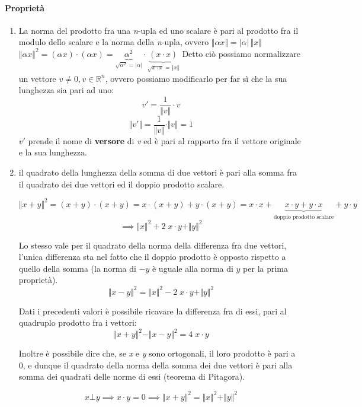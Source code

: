 			\paragraph{Proprietà}
			\begin{enumerate}
				\item La norma del prodotto fra una \textit{n}-upla ed uno scalare è pari al prodotto fra il modulo dello scalare e la norma della \textit{n}-upla, ovvero \newline
				$\Vert \alpha x \Vert = \vert \alpha \vert \, \Vert x \Vert $ \newline
				$\Vert \alpha x \Vert^2 = (\alpha x) \cdot (\alpha x) = \underbrace{\alpha^2}_{\sqrt{\alpha^2} = \vert \alpha \vert} \cdot \underbrace{(x \cdot x)}_{\sqrt{x \cdot x} = \Vert x \Vert} $ \newline
				Detto ciò possiamo normalizzare un vettore $v \neq 0, v \in \mathbb{R}^n$, ovvero possiamo modificarlo per far sì che la sua lunghezza sia pari ad uno:
				$$v' = \frac{1}{\Vert v \Vert} \cdot v$$
				$$\Vert v' \Vert = \frac{1}{\Vert v \Vert} \cdot \Vert v \Vert = 1$$
				$v'$ prende il nome di \textbf{versore} di \textit{v} ed è pari al rapporto fra il vettore originale e la sua lunghezza.
				\item il quadrato della lunghezza della somma di due vettori è pari alla somma fra il quadrato dei due vettori ed il doppio prodotto scalare.
				\begin{GrayBox}
					$$ \Vert x + y \Vert^2 = (x + y) \cdot (x + y) = x \cdot (x + y) + y \cdot (x + y) = x \cdot x + \underbrace{x \cdot y + y \cdot x}_{\text{doppio prodotto scalare}} + y \cdot y $$
					$$ \implies \Vert x \Vert^2 + 2 \; x \cdot y + \Vert y \Vert^2 $$
				\end{GrayBox}
				
				Lo stesso vale per il quadrato della norma della differenza fra due vettori, l'unica differenza sta nel fatto che il doppio prodotto è opposto rispetto a quello della somma (la norma di $-y$ è uguale alla norma di $y$ per la prima proprietà).
				$$ \Vert x - y \Vert^2 = \Vert x \Vert^2 - 2 \; x \cdot y + \Vert y \Vert^2 $$
				
				Dati i precedenti valori è possibile ricavare la differenza fra di essi, pari al quadruplo prodotto fra i vettori:
				$$ \Vert x + y \Vert^2 - \Vert x - y \Vert^2 = 4 \; x \cdot y $$
				
				Inoltre è possibile dire che, se \textit{x} e \textit{y} sono ortogonali, il loro prodotto è pari a 0, e dunque il quadrato della norma della somma dei due vettori è pari alla somma dei quadrati delle norme di essi (teorema di Pitagora).
				\begin{GrayBox}
					$$x \bot y \implies x \cdot y = 0 \implies \Vert x + y \Vert^2 = \Vert x \Vert^2 + \Vert y \Vert^2 $$
				\end{GrayBox}
			\end{enumerate}
			
